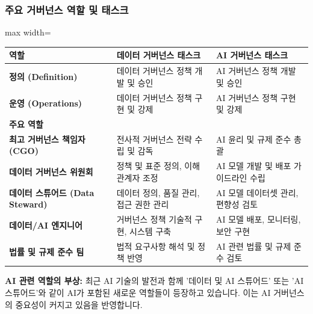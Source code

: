 \documentclass[11pt,a4paper]{article}
\begin{document}
\subsubsection*{주요 거버넌스 역할 및 태스크}
\begin{adjustbox}{max width=\textwidth}
\begin{tabular}{p{}p{}p{}}
\toprule
\textbf{역할} & \textbf{데이터 거버넌스 태스크} & \textbf{AI 거버넌스 태스크} \\
\midrule
\textbf{정의 (Definition)} & 데이터 거버넌스 정책 개발 및 승인 & AI 거버넌스 정책 개발 및 승인 \\
\textbf{운영 (Operations)} & 데이터 거버넌스 정책 구현 및 강제 & AI 거버넌스 정책 구현 및 강제 \\
\midrule
\textbf{주요 역할} & & \\
\textbf{최고 거버넌스 책임자 (CGO)} & 전사적 거버넌스 전략 수립 및 감독 & AI 윤리 및 규제 준수 총괄 \\
\textbf{데이터 거버넌스 위원회} & 정책 및 표준 정의, 이해관계자 조정 & AI 모델 개발 및 배포 가이드라인 수립 \\
\textbf{데이터 스튜어드 (Data Steward)} & 데이터 정의, 품질 관리, 접근 권한 관리 & AI 모델 데이터셋 관리, 편향성 검토 \\
\textbf{데이터/AI 엔지니어} & 거버넌스 정책 기술적 구현, 시스템 구축 & AI 모델 배포, 모니터링, 보안 구현 \\
\textbf{법률 및 규제 준수 팀} & 법적 요구사항 해석 및 정책 반영 & AI 관련 법률 및 규제 준수 검토 \\
\bottomrule
\end{tabular}
\end{adjustbox}
\label{tab:gov_roles}

\begin{tcolorbox}[cautionbox]
\textbf{AI 관련 역할의 부상:}
최근 AI 기술의 발전과 함께 '데이터 및 AI 스튜어드' 또는 'AI 스튜어드'와 같이 AI가 포함된 새로운 역할들이 등장하고 있습니다. 이는 AI 거버넌스의 중요성이 커지고 있음을 반영합니다.
\end{tcolorbox}
\end{document}
